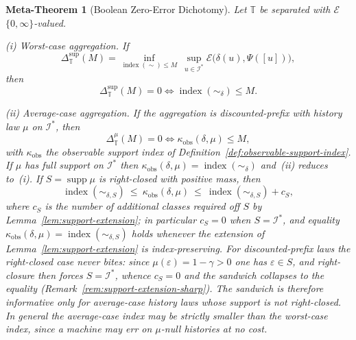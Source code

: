 \documentclass[12pt]{article}
\newtheorem{metatheorem}[theorem]{Meta-Theorem}
\theoremstyle{definition}
\begin{document}
\begin{metatheorem}[Boolean Zero-Error Dichotomy]
\label{meta:boolean}
Let $\mathbb T$ be separated with $\mathcal E$ $\{0,\infty\}$-valued.

\emph{(i) Worst-case aggregation.}  If
\[
\Delta_{\mathbb T}^{\sup}(M)
=
\inf_{\operatorname{index}(\sim)\le M}
\ \sup_{u\in\mathcal I^*}
\mathcal E\bigl(\delta(u),\Psi([u])\bigr),
\]
then
\[
\Delta_{\mathbb T}^{\sup}(M)=0
\iff
\operatorname{index}(\sim_\delta)\le M.
\]

\emph{(ii) Average-case aggregation.}  If the aggregation is discounted-prefix
with history law $\mu$ on $\mathcal I^*$, then
\[
\Delta_{\mathbb T}^{\mu}(M)=0
\iff
\kappa_{\mathrm{obs}}(\delta,\mu)\le M,
\]
with $\kappa_{\mathrm{obs}}$ the observable support index of
Definition~\ref{def:observable-support-index}.  If $\mu$ has full support on
$\mathcal I^*$ then
$\kappa_{\mathrm{obs}}(\delta,\mu)=\operatorname{index}(\sim_\delta)$ and~(ii)
reduces to~(i).  If $S=\operatorname{supp}\mu$ is right-closed with positive
mass, then
\[
\operatorname{index}(\sim_{\delta,S})
\ \le\
\kappa_{\mathrm{obs}}(\delta,\mu)
\ \le\
\operatorname{index}(\sim_{\delta,S})+c_S,
\]
where $c_S$ is the number of additional classes required off $S$ by
Lemma~\ref{lem:support-extension}; in particular $c_S=0$ when
$S=\mathcal I^*$, and equality
$\kappa_{\mathrm{obs}}(\delta,\mu)=\operatorname{index}(\sim_{\delta,S})$ holds
whenever the extension of Lemma~\ref{lem:support-extension} is
index-preserving.
For discounted-prefix laws the right-closed case never bites: since
$\mu(\varepsilon)=1-\gamma>0$ one has $\varepsilon\in S$, and right-closure
then forces $S=\mathcal I^*$, whence $c_S=0$ and the sandwich collapses to the
equality (Remark~\ref{rem:support-extension-sharp}).  The sandwich is
therefore informative only for average-case history laws whose support is not
right-closed.
In general the average-case index may be strictly smaller than the worst-case
index, since a machine may err on $\mu$-null histories at no cost.
\end{metatheorem}
\end{document}
